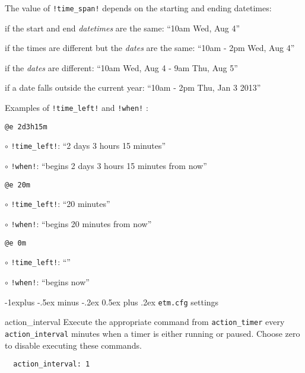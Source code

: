 \documentclass[9pt,landscape]{article}
\makeatletter
\renewcommand{\subsection}{\@startsection{subsection}{2}{0mm}%
                                {-1explus -.5ex minus -.2ex}%
                                {0.5ex plus .2ex}%
                                {\normalfont\normalsize\bfseries}}
\makeatother
\begin{document}
\begin{multicols}{3}
\vskip3pt
The value of \verb'!time_span!' depends on the starting and ending datetimes:
\begin{compactitem}
\item if the start and end \emph{datetimes} are the same: ``10am Wed, Aug 4''
\item if the times are different but the \emph{dates} are the same: ``10am - 2pm Wed, Aug 4''
\item if the \emph{dates} are different: ``10am Wed, Aug 4 - 9am Thu, Aug 5''
\item if a date falls outside the current year: ``10am - 2pm Thu, Jan 3 2013''
\end{compactitem}

Examples of \verb'!time_left!' and \verb'!when!' :
\begin{compactitem}
\item \verb!@e 2d3h15m!
    \begin{compactitem}
        \item[$\circ$] \verb'!time_left!': ``2 days 3 hours 15 minutes''
        \item[$\circ$] \verb'!when!': ``begins 2 days 3 hours 15 minutes from now''
    \end{compactitem}
\item \verb!@e 20m!
    \begin{compactitem}
        \item[$\circ$] \verb'!time_left!': ``20 minutes''
        \item[$\circ$] \verb'!when!': ``begins 20 minutes from now''
    \end{compactitem}
\item \verb!@e 0m!
    \begin{compactitem}
        \item[$\circ$] \verb'!time_left!': ``''
        \item[$\circ$] \verb'!when!': ``begins now''
    \end{compactitem}
\end{compactitem}

\subsection{\texttt{etm.cfg} settings}

\begin{compactdesc}
\item[action\_interval] Execute the appropriate command from \verb'action_timer' every \verb'action_interval' minutes when a timer is either running or paused. Choose zero to disable executing these commands.
\begin{verbatim}
  action_interval: 1
\end{verbatim}


\end{compactdesc}
\end{multicols}
\end{document}
